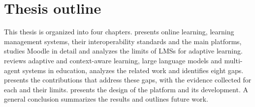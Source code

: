 \section*{Thesis outline}

This thesis is organized into four chapters.  presents
online learning, learning management systems, their interoperability
standards and the main platforms, studies Moodle in detail and analyzes
the limits of LMSs for adaptive learning.  reviews
adaptive and context-aware learning, large language models and
multi-agent systems in education, analyzes the related work and
identifies eight gaps.  presents the
contributions that address these gaps, with the evidence collected for
each and their limits.  presents the design of
the platform and its development. A general conclusion summarizes the
results and outlines future work.
